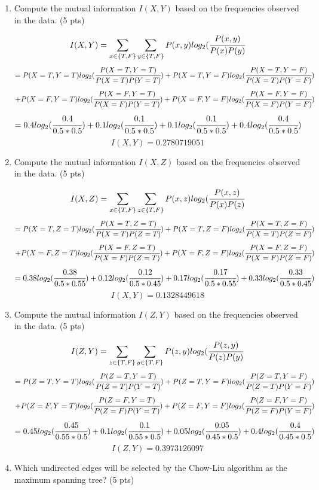 \documentclass[a4paper]{article}
\theoremstyle{definition}
\newenvironment{soln}{
	\leavevmode\color{blue}\ignorespaces
}{}
\begin{document}
\begin{enumerate}
	\item Compute the mutual information $I(X, Y)$ based on the frequencies observed in the data. (5 pts)
        \begin{soln}
        $$I(X,Y) = \sum_{x \in \{ T, F \}} \sum_{y \in \{ T, F \}} P(x, y) log_2 (\cfrac{P(x,y)}{P(x)P(y)}$$
        $$= P(X=T,Y=T)log_2(\cfrac{P(X=T,Y=T)}{P(X=T)P(Y=T)}) + P(X=T,Y=F)log_2(\cfrac{P(X=T,Y=F)}{P(X=T)P(Y=F)})$$
        $$+ P(X=F,Y=T)log_2(\cfrac{P(X=F,Y=T)}{P(X=F)P(Y=T)}) + P(X=F,Y=F)log_2(\cfrac{P(X=F,Y=F)}{P(X=F)P(Y=F)})$$
        $$= 0.4 log_2(\cfrac{0.4}{0.5 * 0.5}) + 0.1 log_2(\cfrac{0.1}{0.5 * 0.5}) + 0.1 log_2(\cfrac{0.1}{0.5 * 0.5}) + 0.4 log_2(\cfrac{0.4}{0.5 * 0.5})$$
        $$I(X,Y) = 0.2780719051$$
        \end{soln}
	\item Compute the mutual information $I(X, Z)$ based on the frequencies observed in the data. (5 pts)
        \begin{soln}
        $$I(X,Z) = \sum_{x \in \{ T, F \}} \sum_{z \in \{ T, F \}} P(x, z) log_2 (\cfrac{P(x,z)}{P(x)P(z)}$$
        $$= P(X=T,Z=T)log_2(\cfrac{P(X=T,Z=T)}{P(X=T)P(Z=T)}) + P(X=T,Z=F)log_2(\cfrac{P(X=T,Z=F)}{P(X=T)P(Z=F)})$$
        $$+ P(X=F,Z=T)log_2(\cfrac{P(X=F,Z=T)}{P(X=F)P(Z=T)}) + P(X=F,Z=F)log_2(\cfrac{P(X=F,Z=F)}{P(X=F)P(Z=F)})$$
        $$= 0.38 log_2(\cfrac{0.38}{0.5 * 0.55}) + 0.12 log_2(\cfrac{0.12}{0.5 * 0.45}) + 0.17 log_2(\cfrac{0.17}{0.5 * 0.55}) + 0.33 log_2(\cfrac{0.33}{0.5 * 0.45})$$
        $$I(X,Y) = 0.1328449618$$
        \end{soln}
	\item Compute the mutual information $I(Z, Y)$ based on the frequencies observed in the data. (5 pts)
        \begin{soln}
        $$I(Z,Y) = \sum_{z \in \{ T, F \}} \sum_{y \in \{ T, F \}} P(z, y) log_2 (\cfrac{P(z,y)}{P(z)P(y)}$$
        $$= P(Z=T,Y=T)log_2(\cfrac{P(Z=T,Y=T)}{P(Z=T)P(Y=T)}) + P(Z=T,Y=F)log_2(\cfrac{P(Z=T,Y=F)}{P(Z=T)P(Y=F)})$$
        $$+ P(Z=F,Y=T)log_2(\cfrac{P(Z=F,Y=T)}{P(Z=F)P(Y=T)}) + P(Z=F,Y=F)log_2(\cfrac{P(Z=F,Y=F)}{P(Z=F)P(Y=F)})$$
        $$= 0.45 log_2(\cfrac{0.45}{0.55 * 0.5}) + 0.1 log_2(\cfrac{0.1}{0.55 * 0.5}) + 0.05 log_2(\cfrac{0.05}{0.45 * 0.5}) + 0.4 log_2(\cfrac{0.4}{0.45 * 0.5})$$
        $$I(Z, Y) = 0.3973126097$$
        \end{soln}
	\item Which undirected edges will be selected by the Chow-Liu algorithm as the maximum spanning tree? (5 pts)

\end{enumerate}
\end{document}
